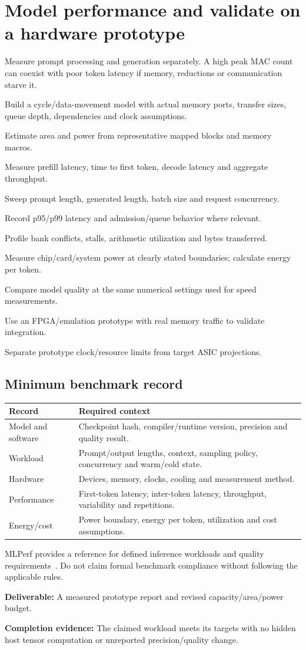 \documentclass[11pt,a4paper]{article}
\newcommand{\phase}[2]{\clearpage\section{#1}\label{#2}}
\newcommand{\deliver}[2]{\begin{tcolorbox}[colback=pale,colframe=line,boxrule=0.5pt,arc=1mm,left=8pt,right=8pt,top=6pt,bottom=6pt]\textbf{Deliverable:} #1\par\textbf{Completion evidence:} #2\end{tcolorbox}}
\begin{document}
\phase{Model performance and validate on a hardware prototype}{sec:performance}
Measure prompt processing and generation separately. A high peak MAC count can
coexist with poor token latency if memory, reductions or communication starve it.
\begin{checklist}
\item Build a cycle/data-movement model with actual memory ports, transfer sizes,
queue depth, dependencies and clock assumptions.
\item Estimate area and power from representative mapped blocks and memory macros.
\item Measure prefill latency, time to first token, decode latency and aggregate throughput.
\item Sweep prompt length, generated length, batch size and request concurrency.
\item Record p95/p99 latency and admission/queue behavior where relevant.
\item Profile bank conflicts, stalls, arithmetic utilization and bytes transferred.
\item Measure chip/card/system power at clearly stated boundaries; calculate energy per token.
\item Compare model quality at the same numerical settings used for speed measurements.
\item Use an FPGA/emulation prototype with real memory traffic to validate integration.
\item Separate prototype clock/resource limits from target ASIC projections.
\end{checklist}
\subsection*{Minimum benchmark record}
\begin{tabularx}{\linewidth}{@{}p{38mm}Y@{}}
\toprule\textbf{Record} & \textbf{Required context}\\\midrule
Model and software & Checkpoint hash, compiler/runtime version, precision and quality result.\\
Workload & Prompt/output lengths, context, sampling policy, concurrency and warm/cold state.\\
Hardware & Devices, memory, clocks, cooling and measurement method.\\
Performance & First-token latency, inter-token latency, throughput, variability and repetitions.\\
Energy/cost & Power boundary, energy per token, utilization and cost assumptions.\\\bottomrule
\end{tabularx}
MLPerf provides a reference for defined inference workloads and quality
requirements~\cite{mlperf}. Do not claim formal benchmark compliance without
following the applicable rules.
\deliver{A measured prototype report and revised capacity/area/power budget.}{The
claimed workload meets its targets with no hidden host tensor computation or
unreported precision/quality change.}
\end{document}
